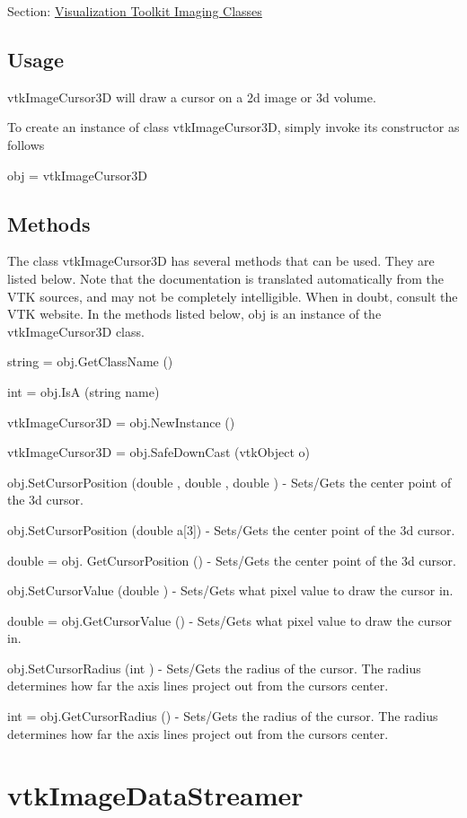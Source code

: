 Section\-: \hyperlink{sec_vtkimaging}{Visualization Toolkit Imaging Classes} \hypertarget{vtkwidgets_vtkxyplotwidget_Usage}{}\subsection{Usage}\label{vtkwidgets_vtkxyplotwidget_Usage}
vtk\-Image\-Cursor3\-D will draw a cursor on a 2d image or 3d volume.

To create an instance of class vtk\-Image\-Cursor3\-D, simply invoke its constructor as follows \begin{DoxyVerb}  obj = vtkImageCursor3D
\end{DoxyVerb}
 \hypertarget{vtkwidgets_vtkxyplotwidget_Methods}{}\subsection{Methods}\label{vtkwidgets_vtkxyplotwidget_Methods}
The class vtk\-Image\-Cursor3\-D has several methods that can be used. They are listed below. Note that the documentation is translated automatically from the V\-T\-K sources, and may not be completely intelligible. When in doubt, consult the V\-T\-K website. In the methods listed below, {\ttfamily obj} is an instance of the vtk\-Image\-Cursor3\-D class. 
\begin{DoxyItemize}
\item {\ttfamily string = obj.\-Get\-Class\-Name ()}  
\item {\ttfamily int = obj.\-Is\-A (string name)}  
\item {\ttfamily vtk\-Image\-Cursor3\-D = obj.\-New\-Instance ()}  
\item {\ttfamily vtk\-Image\-Cursor3\-D = obj.\-Safe\-Down\-Cast (vtk\-Object o)}  
\item {\ttfamily obj.\-Set\-Cursor\-Position (double , double , double )} -\/ Sets/\-Gets the center point of the 3d cursor.  
\item {\ttfamily obj.\-Set\-Cursor\-Position (double a\mbox{[}3\mbox{]})} -\/ Sets/\-Gets the center point of the 3d cursor.  
\item {\ttfamily double = obj. Get\-Cursor\-Position ()} -\/ Sets/\-Gets the center point of the 3d cursor.  
\item {\ttfamily obj.\-Set\-Cursor\-Value (double )} -\/ Sets/\-Gets what pixel value to draw the cursor in.  
\item {\ttfamily double = obj.\-Get\-Cursor\-Value ()} -\/ Sets/\-Gets what pixel value to draw the cursor in.  
\item {\ttfamily obj.\-Set\-Cursor\-Radius (int )} -\/ Sets/\-Gets the radius of the cursor. The radius determines how far the axis lines project out from the cursors center.  
\item {\ttfamily int = obj.\-Get\-Cursor\-Radius ()} -\/ Sets/\-Gets the radius of the cursor. The radius determines how far the axis lines project out from the cursors center.  
\end{DoxyItemize}\hypertarget{vtkimaging_vtkimagedatastreamer}{}\section{vtk\-Image\-Data\-Streamer}\label{vtkimaging_vtkimagedatastreamer}
